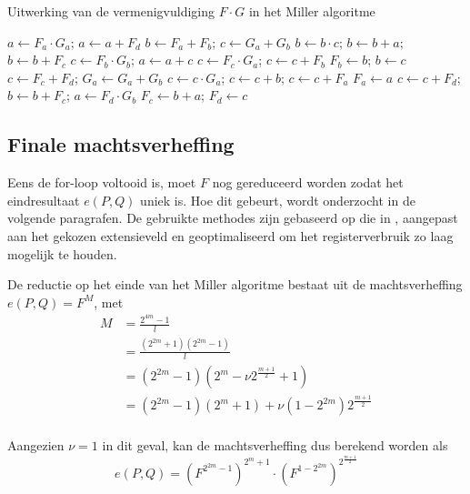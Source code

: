\begin{algorithm}[h]
	\caption{Uitwerking van de vermenigvuldiging $F \cdot G$ in het Miller algoritme}
	\label{algoritme-implementatie-miller-fg}
	$a \gets F_a \cdot G_a$; $a \gets a + F_d$\;
	$b \gets F_a + F_b$; $c \gets G_a + G_b$\;
	$b \gets b \cdot c$; $b \gets b + a$; $b \gets b + F_c$\;
	$c \gets F_b \cdot G_b$; $a \gets a + c$\;
	$c \gets F_c \cdot G_a$;	$c \gets c + F_b$\;
	$F_b \gets b$; $b \gets c$\;
	$c \gets F_c + F_d$; $G_a \gets G_a + G_b$\;
	$c \gets c \cdot G_a$; $c \gets c + b$; $c \gets c + F_a$\;
	$F_a \gets a$\;
	$c \gets c + F_d$; $b \gets b + F_c$; $a \gets F_d \cdot G_b$\;
	$F_c \gets b + a$; $F_d \gets c$\;
\end{algorithm}

\subsection{Finale machtsverheffing\label{subsectie-implementatie-miller-finale-exp}}

Eens de for-loop voltooid is, moet $F$ nog gereduceerd worden zodat het eindresultaat $e(P, Q)$ uniek is. Hoe dit gebeurt, wordt onderzocht in de volgende paragrafen. De gebruikte methodes zijn gebaseerd op die in \cite{beuchat}, aangepast aan het gekozen extensieveld en geoptimaliseerd om het registerverbruik zo laag mogelijk te houden.

De reductie op het einde van het Miller algoritme bestaat uit de machtsverheffing $e(P, Q) = F^M$, met
\[\begin{aligned}
M	&= \frac{2^{4m} - 1}{l}\\
	&= \frac{(2^{2m} + 1)(2^{2m} - 1)}{l}\\
	&= (2^{2m} - 1)(2^m - \nu 2^{\frac{m + 1}{2}} + 1)\\
	&= (2^{2m} - 1)(2^m + 1) + \nu(1 - 2^{2m})2^{\frac{m + 1}{2}}\\
\end{aligned}\]

Aangezien $\nu = 1$ in dit geval, kan de machtsverheffing dus berekend worden als
\[e(P, Q) = \left(F^{2^{2m} - 1}\right)^{2^m + 1} \cdot \left(F^{1 - 2^{2m}}\right)^{2^{\frac{m + 1}{2}}}\]

